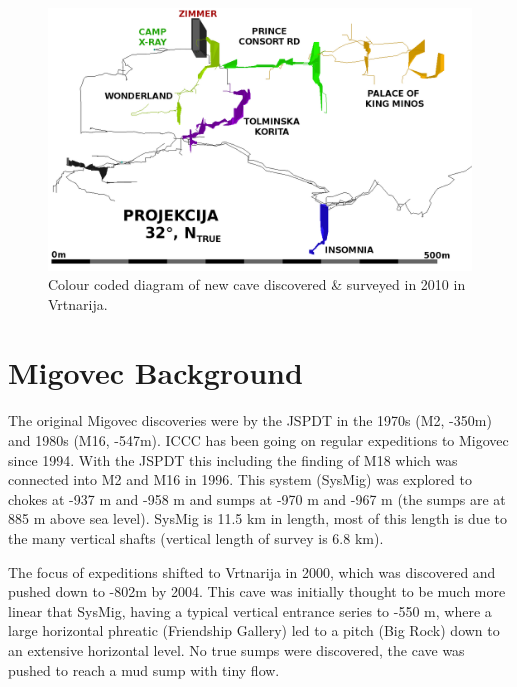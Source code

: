 \documentclass[english,a4]{article}
\begin{document}
\begin{center}
%
\begin{figure}
\centering
\includegraphics[width=0.85\columnwidth]{2010_deep_vrtnarija_colour_coded_inverted_labelled}

\caption{Colour coded diagram of new cave discovered \& surveyed in 2010 in
Vrtnarija.}



\end{figure}

\par\end{center}


\section{Migovec Background}

The original Migovec discoveries were by the JSPDT in the 1970s (M2,
-350m) and 1980s (M16, -547m). ICCC has been going on regular expeditions
to Migovec since 1994. With the JSPDT this including the finding of
M18 which was connected into M2 and M16 in 1996. This system (SysMig)
was explored to chokes at -937 m and -958 m and sumps at -970 m and
-967 m (the sumps are at 885 m above sea level). SysMig is 11.5 km
in length, most of this length is due to the many vertical shafts
(vertical length of survey is 6.8 km).

The focus of expeditions shifted to Vrtnarija in 2000, which was discovered
and pushed down to -802m by 2004. This cave was initially thought
to be much more linear that SysMig, having a typical vertical entrance
series to -550 m, where a large horizontal phreatic (Friendship Gallery)
led to a pitch (Big Rock) down to an extensive horizontal level. No
true sumps were discovered, the cave was pushed to reach a mud sump
with tiny flow.
\end{document}
